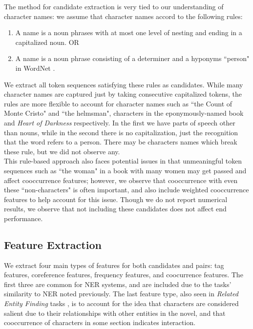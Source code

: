 \documentclass[12pt]{article}
\begin{document}
        The method for candidate extraction is very tied to our understanding of character names: we assume
        that character names accord to the following rules:
        \begin{enumerate}
            \setlength\itemsep{0em}
            \item A name is a noun phrases with at most one level of nesting and ending in a capitalized noun. OR
            \item A name is a noun phrase consisting of a determiner and a hyponyms ``person" in WordNet \cite{miller1995wordnet}. 
        \end{enumerate}

        We extract all token sequences satisfying these rules as candidates.
        While many character names are captured just by taking consecutive capitalized tokens, the rules
        are more flexible to account for character names such as ``the Count of Monte Cristo" and 
        ``the helmsman", characters in the eponymously-named book and \emph{Heart of Darkness} respectively.
        In the first we have parts of speech other than nouns, while in the second there is no capitalization,
        just the recognition that the word refers to a person. There may be characters names which break
        these rule, but we did not observe any.\\

        This rule-based approach also faces potential issues in that unmeaningful token sequences such as
        ``the woman" in a book with many women may get passed and affect cooccurrence features; however,
        we observe that cooccurrence with even these ``non-characters" is often important, and also
        include weighted cooccurrence features to help account for this issue. Though we do not
        report numerical results, we observe that not including these candidates does not affect 
        end performance.

    \subsection{Feature Extraction}

        We extract four main types of features for both candidates and pairs: tag features,
        coreference features, frequency features, and coocurrence features. The first three are common
        for NER systems, and are included due to the tasks' similarity to NER noted previously. The last
        feature type, also seen in \emph{Related Entity Finding} tasks \cite{bron2009related,yang2009experiments}, is to account
        for the idea that characters are considered salient due to their relationships with other
        entities in the novel, and that cooccurrence of characters in some section indicates interaction. \\
\end{document}
